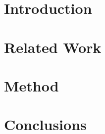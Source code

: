 \documentclass[harvard]{lincolncsthesis}
\begin{document}

\maketitle







\thesisTables
\thesisBodyStart



\chapter{Introduction}


\chapter{Related Work}


\chapter{Method}


\chapter{Conclusions}




\printReferences

\printLudography

\end{document}
